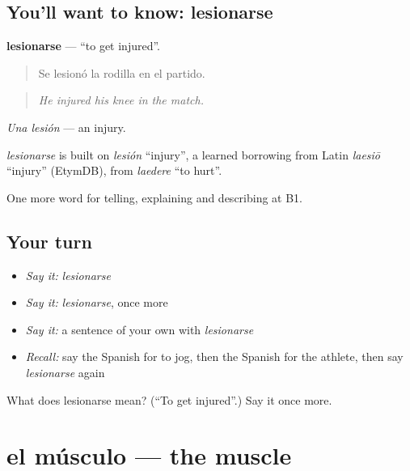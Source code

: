 \subsection*{You'll want to know: lesionarse}
\textbf{lesionarse} — \textquotedblleft{}to get injured\textquotedblright{}.

\begin{quote}
Se lesionó la rodilla en el partido.
\end{quote}

\begin{quote}
\emph{He injured his knee in the match.}
\end{quote}

\emph{Una lesión} — an injury.

\begin{cousinweb}
\emph{lesionarse} is built on \emph{lesión} \textquotedblleft{}injury\textquotedblright{}, a learned borrowing from Latin \emph{laesiō} \textquotedblleft{}injury\textquotedblright{} (EtymDB), from \emph{laedere} \textquotedblleft{}to hurt\textquotedblright{}.
\end{cousinweb}

\begin{grammarlens}[title={What you've built}]
One more word for telling, explaining and describing at B1.
\end{grammarlens}

\subsection*{Your turn}
\begin{itemize}
\raggedright
  \item \emph{Say it:} \emph{lesionarse}
  \item \emph{Say it:} \emph{lesionarse}, once more
  \item \emph{Say it:} a sentence of your own with \emph{lesionarse}
  \item \emph{Recall:} say the Spanish for to jog, then the Spanish for the athlete, then say \emph{lesionarse} again
\end{itemize}

\begin{tcolorbox}[breakable,colback=teal!4,colframe=teal!35!black,title={Before you move on}]
What does lesionarse mean? (\textquotedblleft{}To get injured\textquotedblright{}.) Say it once more.
\end{tcolorbox}
\section[el músculo]{el músculo — the muscle}

